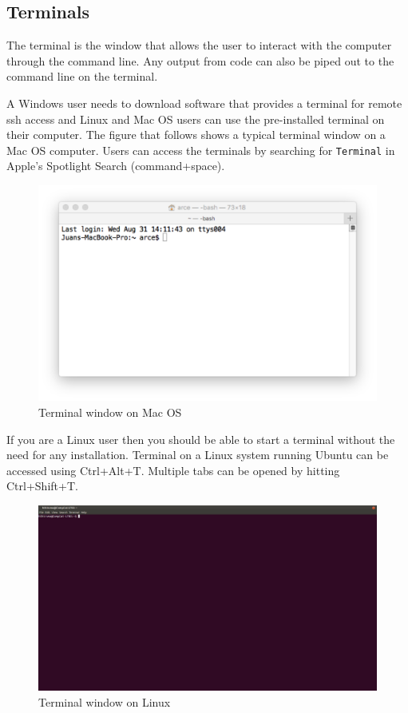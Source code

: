 \documentclass[11pt]{article}
\begin{document}
\subsection{Terminals}
\label{sec-2-4}
The terminal is the window that allows the user to interact with the computer through the command line. Any output from code can also be piped out to the command line on the terminal.

A Windows user needs to download software that provides a terminal for remote ssh access and Linux and Mac OS users can use the pre-installed terminal on their computer. The figure that follows shows a typical terminal window on a Mac OS computer. Users can access the terminals by searching for \texttt{Terminal} in Apple's Spotlight Search (command+space).

\begin{figure}[htb]
\centering
\includegraphics[width=.9\linewidth]{./figures/terminal-mac.png}
\caption{Terminal window on Mac OS}
\end{figure}

If you are a Linux user then you should be able to start a terminal without the need for any installation. Terminal on a Linux system running Ubuntu can be accessed using Ctrl+Alt+T. Multiple tabs can be opened by hitting Ctrl+Shift+T.
\begin{figure}[htb]
\centering
\includegraphics[width=.9\linewidth]{./figures/Ubuntu-terminal.png}
\caption{Terminal window on Linux}
\end{figure}
\end{document}
